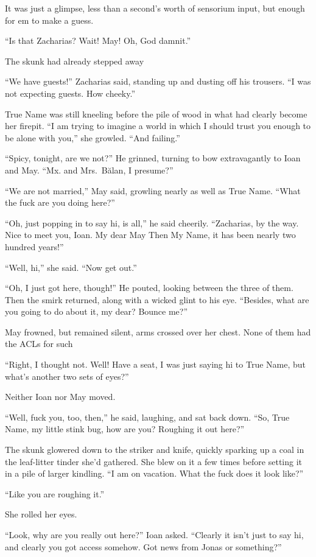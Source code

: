 It was just a glimpse, less than a second's worth of sensorium input, but enough for em to make a guess.

``Is that Zacharias? Wait! May! Oh, God damnit.''

The skunk had already stepped away

``We have guests!'' Zacharias said, standing up and dusting off his trousers. ``I was not expecting guests. How cheeky.''

True Name was still kneeling before the pile of wood in what had clearly become her firepit. ``I am trying to imagine a world in which I should trust you enough to be alone with you,'' she growled. ``And failing.''

``Spicy, tonight, are we not?'' He grinned, turning to bow extravagantly to Ioan and May. ``Mx. and Mrs.~Bălan, I presume?''

``We are not married,'' May said, growling nearly as well as True Name. ``What the fuck are you doing here?''

``Oh, just popping in to say hi, is all,'' he said cheerily. ``Zacharias, by the way. Nice to meet you, Ioan. My dear May Then My Name, it has been nearly two hundred years!''

``Well, hi,'' she said. ``Now get out.''

``Oh, I just got here, though!'' He pouted, looking between the three of them. Then the smirk returned, along with a wicked glint to his eye. ``Besides, what are you going to do about it, my dear? Bounce me?''

May frowned, but remained silent, arms crossed over her chest. None of them had the ACLs for such

``Right, I thought not. Well! Have a seat, I was just saying hi to True Name, but what's another two sets of eyes?''

Neither Ioan nor May moved.

``Well, fuck you, too, then,'' he said, laughing, and sat back down. ``So, True Name, my little stink bug, how are you? Roughing it out here?''

The skunk glowered down to the striker and knife, quickly sparking up a coal in the leaf-litter tinder she'd gathered. She blew on it a few times before setting it in a pile of larger kindling. ``I am on vacation. What the fuck does it look like?''

``Like you are roughing it.''

She rolled her eyes.

``Look, why are you really out here?'' Ioan asked. ``Clearly it isn't just to say hi, and clearly you got access somehow. Got news from Jonas or something?''

